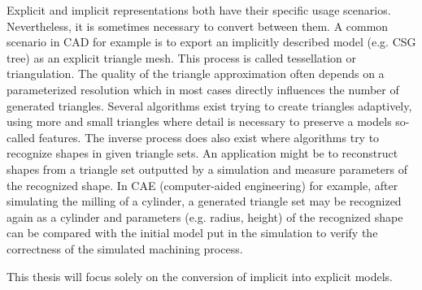 Explicit and implicit representations both have their specific usage scenarios. Nevertheless, it is sometimes necessary to convert between them.
A common scenario in CAD for example is to export an implicitly described model (e.g. CSG tree) as an explicit triangle mesh. This process is called tessellation or triangulation. The quality of the triangle approximation often depends on a parameterized resolution which in most cases directly influences the number of generated triangles. Several algorithms exist trying to create triangles adaptively, using more and small triangles where detail is necessary to preserve a models so-called features.
The inverse process does also exist where algorithms try to recognize shapes in given triangle sets. An application might be to reconstruct shapes from a triangle set outputted by a simulation and measure parameters of the recognized shape. In CAE (computer-aided engineering) for example, after simulating the milling of a cylinder, a generated triangle set may be recognized again as a cylinder and parameters (e.g. radius, height) of the recognized shape can be compared with the initial model put in the simulation to verify the correctness of the simulated machining process.

This thesis will focus solely on the conversion of implicit into explicit models.